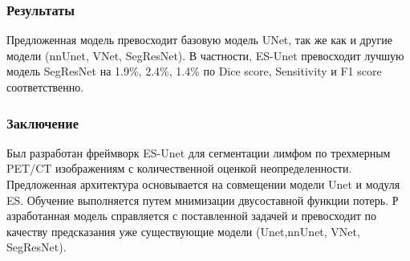 \subsubsection*{Результаты} 
\par
Предложенная модель превосходит базовую модель UNet\cite{Unet}, так же как и другие модели (nnUnet, VNet, SegResNet). 
В частности, ES-Unet превосходит лучшую модель SegResNet на 1.9\%, 2.4\%, 1.4\% по Dice score, Sensitivity и F1 score соответственно.
\subsubsection*{Заключение}
Был разработан фреймворк ES-Unet для сегментации лимфом по трехмерным PET/CT изображениям с 
количественной оценкой неопределенности. Предложенная архитектура основывается на совмещении 
модели Unet и модуля ES. Обучение выполняется путем мнимизации двусоставной функции потерь. Р
азработанная модель справляется с поставленной задачей и превосходит по качеству предсказания 
уже существующие модели (Unet,nnUnet, VNet, SegResNet).